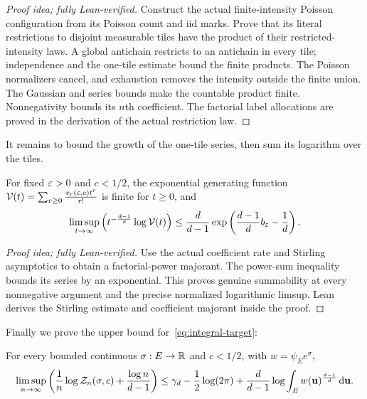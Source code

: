 \documentclass[11pt,letterpaper]{article}
\begin{document}
\begin{proof}[Proof idea; fully Lean-verified]
Construct the actual finite-intensity Poisson configuration from its Poisson count and iid marks. Prove that its literal restrictions to disjoint measurable tiles have the product of their restricted-intensity laws. A global antichain restricts to an antichain in every tile; independence and the one-tile estimate bound the finite products. The Poisson normalizers cancel, and exhaustion removes the intensity outside the finite union. The Gaussian and series bounds make the countable product finite. Nonnegativity bounds its $n$th coefficient. The factorial label allocations are proved in the derivation of the actual restriction law.
\end{proof}

It remains to bound the growth of the one-tile series, then sum its logarithm over the tiles.


\begin{lemma}\label{lem:series}
      For fixed $\varepsilon>0$ and $c<1/2$, the exponential generating function $\mathcal V(t)=\sum_{r\ge0}\frac{v_r(\varepsilon,c)t^r}{r!}$ is finite for $t\ge0$, and
      \begin{equation}\label{eq:series}
            \limsup_{t\to\infty}\left(t^{-\frac{d-1}{d}} \log \mathcal V(t)\right) \le\frac d{d-1}\exp\left(\frac{d-1}{d}b_\varepsilon-\frac1d\right).
      \end{equation}
\end{lemma}

\begin{proof}[Proof idea; fully Lean-verified]
Use the actual coefficient rate and Stirling asymptotics to obtain a factorial-power majorant. The power-sum inequality bounds its series by an exponential. This proves genuine summability at every nonnegative argument and the precise normalized logarithmic limsup. Lean derives the Stirling estimate and coefficient majorant inside the proof.
\end{proof}

Finally we prove the upper bound for~\eqref{eq:integral-target}:

\begin{lemma}\label{lem:upper}
      For every bounded continuous $\sigma:E\to\mathbb R$ and $c<1/2$, with $w=\psi_Ee^\sigma$,
      \begin{equation}\label{eq:upper-bound}
            \limsup_{n\to\infty}\left(\frac1n\log\mathcal Z_n(\sigma,c)+\frac{\log n}{d-1}\right)
            \le\gamma_d-\frac12\log(2\pi)+\frac d{d-1}\log\int_Ew(\mathbf u)^{\frac{d-1}{d}}\,\mathrm d\mathbf u.
      \end{equation}
\end{lemma}
\end{document}
